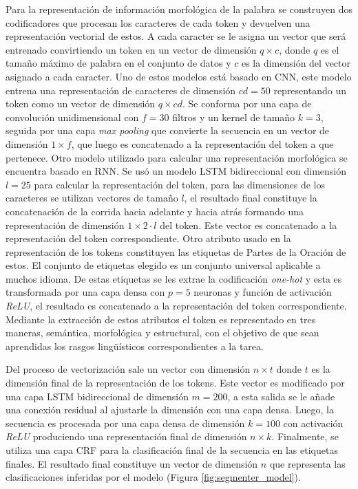 \documentclass[a4paper,11pt,twocolumn,twoside]{article}
\begin{document}
Para la representación de información morfológica de la palabra se construyen dos
codificadores que procesan los caracteres de cada token y devuelven una representación vectorial de estos.
A cada caracter se le asigna un vector que será entrenado convirtiendo un token en un vector de dimensión
$q \times c$, donde $q$ es el tamaño máximo de palabra en el conjunto de datos y $c$ es la dimensión del vector
asignado a cada caracter.
Uno de estos modelos está basado en CNN, este modelo entrena una representación de caracteres de dimensión
$cd=50$ representando un token como un vector de dimensión $q \times cd$. Se conforma por una capa de convolución unidimensional
con $f=30$ filtros y un kernel de tamaño $k=3$, seguida por una capa \textit{max pooling} que convierte la secuencia en un vector
de dimensión $1 \times f$, que luego es concatenado a la representación del token a que pertenece.
Otro modelo utilizado para calcular una representación morfológica se encuentra basado en RNN. Se usó
un modelo LSTM bidireccional con dimensión $l=25$ para calcular la representación del token, para las dimensiones de los caracteres se
utilizan vectores de tamaño $l$, el resultado final constituye la concatenación de la corrida hacia adelante y
hacia atrás formando una representación de dimensión $1 \times 2 \cdot l$ del token. Este vector es concatenado a la representación
del token correspondiente. Otro atributo usado en la representación de los tokens constituyen las etiquetas de 
Partes de la Oración de estos.
El conjunto de etiquetas elegido es un conjunto universal \cite{petrov2011universal} aplicable a muchos idioma.
De estas etiquetas se les extrae la codificación \textit{one-hot} y esta es transformada por una capa densa con $p=5$ neuronas
y función de activación \textit{ReLU}, el resultado es concatenado a la representación del token correspondiente. Mediante 
la extracción de estos atributos el token es representado en tres maneras, semántica, morfológica y estructural, con el 
objetivo de que sean aprendidas los rasgos lingüísticos correspondientes a la tarea.

Del proceso de vectorización sale un vector con dimensión $n \times t$ donde $t$ es la dimensión final de la representación
de los tokens. Este vector es modificado por una capa LSTM bidireccional de dimensión $m=200$, a esta salida se le 
añade una conexión residual al ajustarle la dimensión con una capa densa. Luego, la secuencia es procesada por una 
capa densa de dimensión $k=100$ con activación \textit{ReLU} produciendo una representación final de dimensión 
$n \times k$. Finalmente, se utiliza una capa CRF
para la clasificación final de la secuencia en las etiquetas finales. El resultado final constituye un vector
de dimensión $n$ que representa las clasificaciones inferidas por el modelo (Figura \ref{fig:segmenter_model}).
\end{document}
